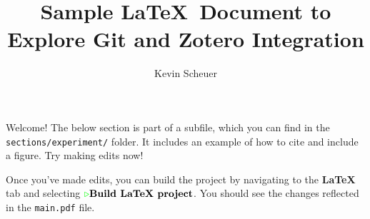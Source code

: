 \documentclass{article}
\title{Sample \LaTeX\ Document to Explore Git and Zotero Integration}
\author{Kevin Scheuer}
\begin{document}
\maketitle

Welcome! The below section is part of a subfile, which you can find in the
\colorbox{light-gray}{\texttt{sections/experiment/}} folder. It includes an example of
how to cite and include a figure. Try making edits now!

Once you've made edits, you can build the project by navigating to the \textbf{LaTeX}
tab and selecting $\textcolor{green}{\triangleright} \textbf{Build LaTeX project}$. You
should see the changes reflected in the \colorbox{light-gray}{\texttt{main.pdf}} file.



\newpage

\end{document}
